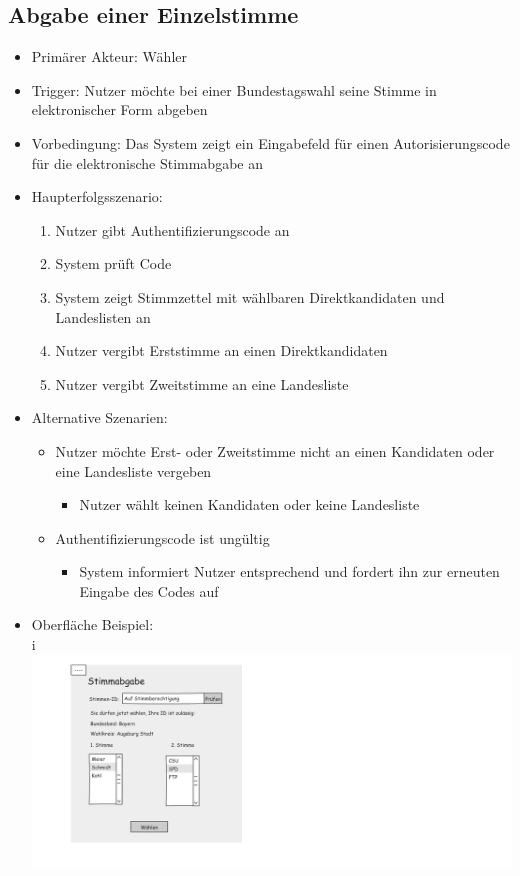 \documentclass[a4paper]{scrreprt}
\begin{document}
\subsection{Abgabe einer Einzelstimme}
\begin{itemize}
\item Primärer Akteur: Wähler
\item Trigger: Nutzer möchte bei einer Bundestagswahl seine Stimme in elektronischer Form abgeben
\item Vorbedingung: Das System zeigt ein Eingabefeld für einen Autorisierungscode für die elektronische Stimmabgabe an
\item Haupterfolgsszenario:
\begin{enumerate}
\item Nutzer gibt Authentifizierungscode an
\item System prüft Code
\item System zeigt Stimmzettel mit wählbaren Direktkandidaten und Landeslisten an
\item Nutzer vergibt Erststimme an einen Direktkandidaten
\item Nutzer vergibt Zweitstimme an eine Landesliste
\end{enumerate}
\item Alternative Szenarien:
\begin{itemize}
\item Nutzer möchte Erst- oder Zweitstimme nicht an einen Kandidaten oder eine Landesliste vergeben
\begin{itemize}
\item Nutzer wählt keinen Kandidaten oder keine Landesliste
\end{itemize}
\item Authentifizierungscode ist ungültig
\begin{itemize}
\item System informiert Nutzer entsprechend und fordert ihn zur erneuten Eingabe des Codes auf
\end{itemize}
\end{itemize}
\item Oberfläche Beispiel: \\
i\includegraphics[width=.9\textwidth]{images/whlen.png}
\end{itemize}
 
\end{document}
